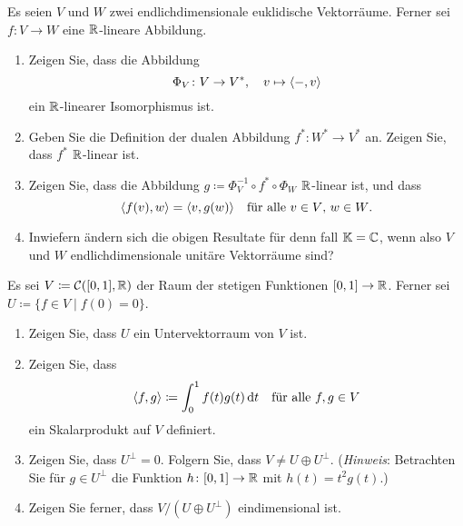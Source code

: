 \documentclass[a4paper,10pt]{article}
\begin{document}


\begin{question}
  Es seien $V$ und $W$ zwei endlichdimensionale euklidische Vektorräume.
  Ferner sei $f \colon V \to W$ eine $\mathbb{R}$-lineare Abbildung.
  \begin{enumerate}[leftmargin=*]
    \item
      Zeigen Sie, dass die Abbildung
      \[
        \Phi_V \colon V \to V^*,
        \quad
        v \mapsto \langle -, v \rangle
      \]
      ein $\mathbb{R}$-linearer Isomorphismus ist.
    \item
      Geben Sie die Definition der dualen Abbildung $f^* \colon W^* \to V^*$ an.
      Zeigen Sie, dass $f^*$ $\mathbb{R}$-linear ist.
    \item
      Zeigen Sie, dass die Abbildung $g \coloneqq \Phi_V^{-1} \circ f^* \circ \Phi_W$ $\mathbb{R}$-linear ist, und dass
      \[
        \langle f(v), w \rangle = \langle v, g(w) \rangle
        \quad
        \text{für alle $v \in V$, $w \in W$}.
      \]
    \item
      Inwiefern ändern sich die obigen Resultate für denn fall $\mathbb{K} = \mathbb{C}$, wenn also $V$ und $W$ endlichdimensionale unitäre Vektorräume sind?
  \end{enumerate}
\end{question}


\begin{question}
  Es sei $V \coloneqq \mathcal{C}([0,1], \mathbb{R})$ der Raum der stetigen Funktionen $[0,1] \to \mathbb{R}$.
  Ferner sei $U \coloneqq \{f \in V \mid f(0) = 0\}$.
  \begin{enumerate}[leftmargin=*]
    \item
      Zeigen Sie, dass $U$ ein Untervektorraum von $V$ ist.
    \item
      Zeigen Sie, dass
      \[
        \langle f, g \rangle \coloneqq \int_0^1 f(t) g(t) \,\text{d}t
        \quad
        \text{für alle $f, g \in V$}
      \]
      ein Skalarprodukt auf $V$ definiert.
    \item
      Zeigen Sie, dass $U^\perp = 0$.
      Folgern Sie, dass $V \neq U \oplus U^\perp$.
      (\emph{Hinweis}: Betrachten Sie für $g \in U^\perp$ die Funktion $h \colon [0,1] \to \mathbb{R}$ mit $h(t) = t^2 g(t)$.)
    \item
      Zeigen Sie ferner, dass $V/(U \oplus U^\perp)$ eindimensional ist.
  \end{enumerate}
\end{question}
\end{document}
